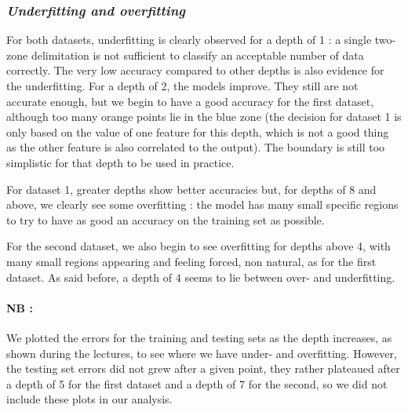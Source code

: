 \subsubsection{{\it Underfitting and overfitting}}
For both datasets, underfitting is clearly observed for a depth of 1 : a single two-zone delimitation is not sufficient to classify an acceptable number of data correctly. The very low accuracy compared to other depths is also evidence for the underfitting. For a depth of 2, the models improve. They still are not accurate enough, but we begin to have a good accuracy for the first dataset, although too many orange points lie in the blue zone (the decision for dataset 1 is only based on the value of one feature for this depth, which is not a good thing as the other feature is also correlated to the output). The boundary is still too simplistic for that depth to be used in practice.\par
For dataset 1, greater depths show better accuracies but, for depths of 8 and above, we clearly see some overfitting : the model has many small specific regions to try to have as good an accuracy on the training set as possible.\par
For the second dataset, we also begin to see overfitting for depths above 4, with many small regions appearing and feeling \og{}forced\fg{}, non natural, as for the first dataset. As said before, a depth of $4$ seems to lie between over- and underfitting.\par 

\paragraph{NB :} We plotted the errors for the training and testing sets as the depth increases, as shown during the lectures, to see where we have under- and overfitting. However, the testing set errors did not grew after a given point, they rather plateaued after a depth of 5 for the first dataset and a depth of 7 for the second, so we did not include these plots in our analysis.

